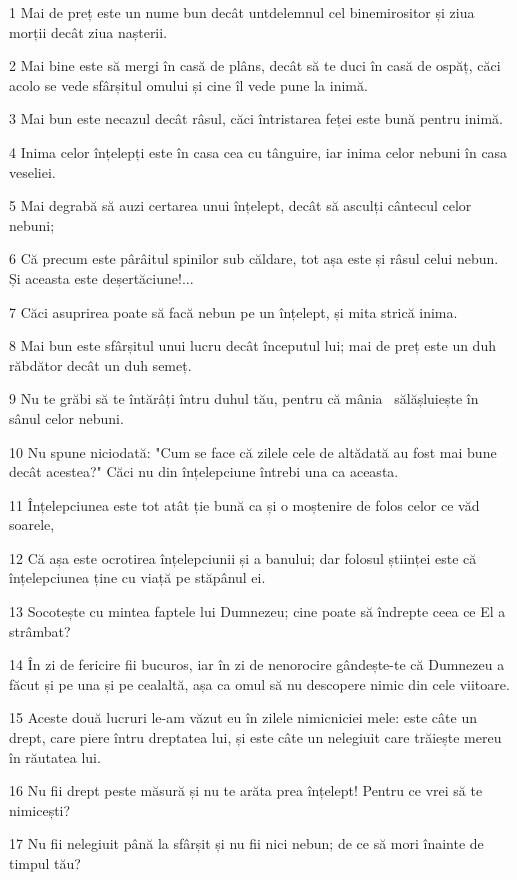 \par 1 Mai de preț este un nume bun decât untdelemnul cel binemirositor și ziua morții decât ziua nașterii.
\par 2 Mai bine este să mergi în casă de plâns, decât să te duci în casă de ospăț, căci acolo se vede sfârșitul omului și cine îl vede pune la inimă.
\par 3 Mai bun este necazul decât râsul, căci întristarea feței este bună pentru inimă.
\par 4 Inima celor înțelepți este în casa cea cu tânguire, iar inima celor nebuni în casa veseliei.
\par 5 Mai degrabă să auzi certarea unui înțelept, decât să asculți cântecul celor nebuni;
\par 6 Că precum este pârâitul spinilor sub căldare, tot așa este și râsul celui nebun. Și aceasta este deșertăciune!...
\par 7 Căci asuprirea poate să facă nebun pe un înțelept, și mita strică inima.
\par 8 Mai bun este sfârșitul unui lucru decât începutul lui; mai de preț este un duh răbdător decât un duh semeț.
\par 9 Nu te grăbi să te întărâți întru duhul tău, pentru că mânia  sălășluiește în sânul celor nebuni.
\par 10 Nu spune niciodată: "Cum se face că zilele cele de altădată au fost mai bune decât acestea?" Căci nu din înțelepciune întrebi una ca aceasta.
\par 11 Înțelepciunea este tot atât ție bună ca și o moștenire de folos celor ce văd soarele,
\par 12 Că așa este ocrotirea înțelepciunii și a banului; dar folosul științei este că înțelepciunea ține cu viață pe stăpânul ei.
\par 13 Socotește cu mintea faptele lui Dumnezeu; cine poate să îndrepte ceea ce El a strâmbat?
\par 14 În zi de fericire fii bucuros, iar în zi de nenorocire gândește-te că Dumnezeu a făcut și pe una și pe cealaltă, așa ca omul să nu descopere nimic din cele viitoare.
\par 15 Aceste două lucruri le-am văzut eu în zilele nimicniciei mele: este câte un drept, care piere întru dreptatea lui, și este câte un nelegiuit care trăiește mereu în răutatea lui.
\par 16 Nu fii drept peste măsură și nu te arăta prea înțelept! Pentru ce vrei să te nimicești?
\par 17 Nu fii nelegiuit până la sfârșit și nu fii nici nebun; de ce să mori înainte de timpul tău?
